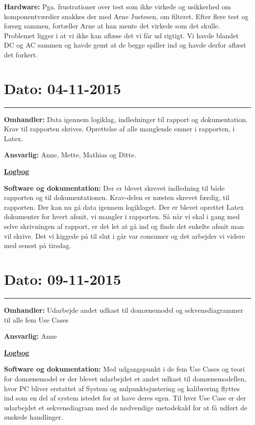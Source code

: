 \textbf{Hardware: } Pga. frustrationer over test som ikke virkede og usikkerhed om komponentværdier snakkes der med Arne Justesen, om filteret. Efter flere test og forsøg sammen, fortæller Arne at han mente det virkede som det skulle. Problemet ligger i at vi ikke kan aflæse det vi får ud rigtigt. Vi havde blandet DC og AC sammen og havde gemt at de begge spiller ind og havde derfor aflæst det forkert.  
\\

\section{Dato: 04-11-2015}
\hrule
\textbf{Omhandler:} Data igennem logiklag, indledninger til rapport og dokumentation. Krav til rapporten skrives. 
Oprettelse af alle manglende emner i rapporten, i Latex. 

\textbf{Ansvarlig:} Anne, Mette, Mathias og Ditte. 

\underline{\textbf{Logbog}}

\textbf{Software og dokumentation: }Der er blevet skrevet indledning til både rapporten og til dokumentationen. Krav-delen er næsten skrevet færdig, til rapporten. 
Der kan nu gå data igennem logiklaget. 
Der er blevet oprettet Latex dokumenter for hvert afsnit, vi mangler i rapporten. Så når vi skal i gang med selve skrivningen af rapport, er det let at gå ind og finde det enkelte afsnit man vil skrive. 
Det vi kiggede på til slut i går var consumer og det arbejder vi videre med senest på tirsdag. 
\\

\section{Dato: 09-11-2015}
\hrule
\textbf{Omhandler:} Udarbejde andet udkast til domænemodel og sekvensdiagrammer til alle fem Use Cases

\textbf{Ansvarlig:} Anne

\underline{\textbf{Logbog}}

\textbf{Software og dokumentation: }Med udgangspunkt i de fem Use Cases og teori for domænemodel er der blevet udarbejdet et andet udkast til domænemodellen, hvor PC bliver erstattet af System og nulpunktsjustering og kalibrering flyttes ind som en del af system istedet for at have deres egen.
Til hver Use Case er der udarbejdet et sekvensdiagram med de nødvendige metodekald for at få udført de ønskede handlinger.
\\

